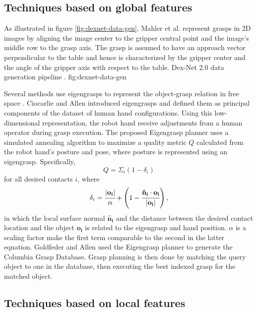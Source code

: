 \subsection{Techniques based on global features}
As illustrated in figure \ref{fig:dexnet-data-gen}, Mahler et al. \cite{mahler2017} represent grasps in 2D images by
aligning the image center to the gripper central point and the image's middle row to the grasp axis. The grasp is
assumed to have an approach vector perpendicular to the table and hence is characterized by the gripper center and the
angle of the gripper axis with respect to the table.
             {Dex-Net 2.0 data generation pipeline \cite{mahler2017}.}
             {fig:dexnet-data-gen}{\textwidth}

Several methods use eigengrasps to represent the object-grasp relation in free space \cite{Goldfeder2011,Ciocarlie2009}.
Ciocarlie and Allen \cite{Ciocarlie2009} introduced eigengrasps and defined them as principal components of the dataset
of human hand configurations. Using this low-dimensional representation, the robot hand receive adjustments from a human
operator during grasp execution. The proposed Eigengrasp planner uses a simulated annealing algorithm to maximize a
quality metric $Q$ calculated from the robot hand's posture and pose, where posture is represented using an eigengrasp.
Specifically,
\[ Q = \Sigma_i (1 - \delta_i) \]
for all desired contacts $i$, where
\[ \delta_i = \cfrac{|\mathbf{o_i}|}{\alpha}
+ \left(1 - \cfrac{\mathbf{\hat{n}_i} \cdot \mathbf{o_i}}{|\mathbf{o_i}|} \right), \]
in which the local surface normal $\mathbf{\hat{n}_i}$ and the distance between the desired contact location and the
object $\mathbf{o_i}$ is related to the eigengrasp and hand position. $\alpha$ is a scaling factor make the first term
comparable to the second in the latter equation. Goldfeder and Allen \cite{Goldfeder2011} used the Eigengrasp planner
to generate the Columbia Grasp Database. Grasp planning is then done by matching the query object to one in the
database, then executing the best indexed grasp for the matched object.

\subsection{Techniques based on local features} \label{subsub:object_grasp_local}

